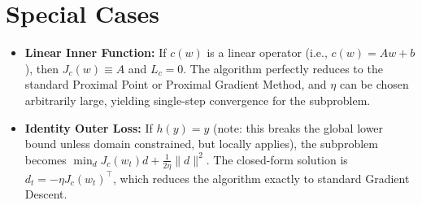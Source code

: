 \documentclass[11pt]{article}
\begin{document}
\section*{Special Cases}
\begin{itemize}
    \item \textbf{Linear Inner Function:} If $c(w)$ is a linear operator (i.e., $c(w) = Aw + b$), then $J_c(w) \equiv A$ and $L_c = 0$. The algorithm perfectly reduces to the standard Proximal Point or Proximal Gradient Method, and $\eta$ can be chosen arbitrarily large, yielding single-step convergence for the subproblem.
    \item \textbf{Identity Outer Loss:} If $h(y) = y$ (note: this breaks the global lower bound unless domain constrained, but locally applies), the subproblem becomes $\min_d J_c(w_t)d + \frac{1}{2\eta}\|d\|^2$. The closed-form solution is $d_t = -\eta J_c(w_t)^\top$, which reduces the algorithm exactly to standard Gradient Descent.
\end{itemize}
\end{document}
